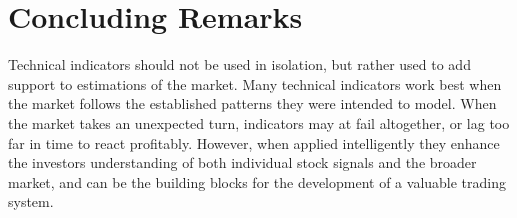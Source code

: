 \chapter{Concluding Remarks}
%
Technical indicators should not be used in isolation, but rather used to add support to estimations of the market.  Many technical indicators work best when the market follows the established patterns they were intended to model.  When the market takes an unexpected turn, indicators may at fail altogether, or lag too far in time to react profitably.  However, when applied intelligently they enhance the investors understanding of both individual stock signals and the broader market, and can be the building blocks for the development of a valuable trading system.

